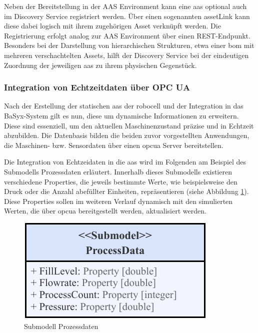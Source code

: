 

Neben der Bereitstellung in der AAS Environment kann eine \acs{aas} optional auch im Discovery Service registriert werden.
Über einen sogenannten assetLink kann diese dabei logisch mit ihrem zugehörigen Asset verknüpft werden.
Die Registrierung erfolgt analog zur AAS Environment über einen REST-Endpunkt.
Besonders bei der Darstellung von hierarchischen Strukturen, etwa einer \acs{bom} mit mehreren verschachtelten Assets, hilft der Discovery Service bei der eindeutigen Zuordnung der jeweiligen \acs{aas} zu ihrem physischen Gegenstück.

\subsubsection{Integration von Echtzeitdaten über OPC UA}
Nach der Erstellung der statischen \acs{aas} der robocell und der Integration in das BaSyx-System gilt es nun, diese um dynamische Informationen zu erweitern.
Diese sind essenziell, um den aktuellen Maschinenzustand präzise und in Echtzeit abzubilden.
Die Datenbasis bilden die beiden zuvor vorgestellten Anwendungen, die Maschinen- bzw. Sensordaten über einen \acs{opcua} Server bereitstellen.

Die Integration von Echtzeidaten in die \acs{aas} wird im Folgenden am Beispiel des Submodells Prozessdaten erläutert.
Innerhalb dieses Submodells existieren verschiedene Properties, die jeweils bestimmte Werte, wie beispielsweise den Druck oder die Anzahl abefüllter Einheiten, repräsentieren (siehe Abbildung \ref{fig:SubmodellProzessdaten}). %
Diese Properties sollen im weiteren Verlauf dynamisch mit den simulierten Werten, die über \acs{opcua} bereitgestellt werden, aktualisiert werden.

\begin{figure}[htbp]
    \centering
    \includegraphics{Bilder/OPCUA/SubmodellProzessdaten.pdf}
    \caption{Submodell Prozessdaten}
    \label{fig:SubmodellProzessdaten}
\end{figure}

